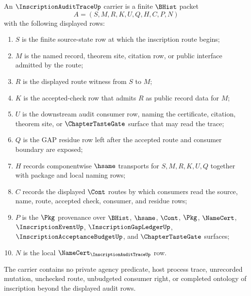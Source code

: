 \begin{definition}
\label{def:inscription-audit-trace-carrier}
An $\InscriptionAuditTraceUp$ carrier is a finite $\BHist$ packet
$$
A=(S,M,R,K,U,Q,H,C,P,N)
$$
with the following displayed rows:
\begin{enumerate}
\item $S$ is the finite source-state row at which the inscription route begins;
\item $M$ is the named record, theorem site, citation row, or public interface admitted by the route;
\item $R$ is the displayed route witness from $S$ to $M$;
\item $K$ is the accepted-check row that admits $R$ as public record data for $M$;
\item $U$ is the downstream audit consumer row, naming the certificate, citation, theorem site, or $\ChapterTasteGate$ surface that may read the trace;
\item $Q$ is the GAP residue row left after the accepted route and consumer boundary are exposed;
\item $H$ records componentwise $\hsame$ transports for $S,M,R,K,U,Q$ together with package and local naming rows;
\item $C$ records the displayed $\Cont$ routes by which consumers read the source, name, route, accepted check, consumer, and residue rows;
\item $P$ is the $\Pkg$ provenance over $\BHist$, $\hsame$, $\Cont$, $\Pkg$, $\NameCert$, $\InscriptionEventUp$, $\InscriptionGapLedgerUp$, $\InscriptionAcceptanceBudgetUp$, and $\ChapterTasteGate$ surfaces;
\item $N$ is the local $\NameCert_{\InscriptionAuditTraceUp}$ row.
\end{enumerate}
The carrier contains no private agency predicate, host process trace, unrecorded mutation, unchecked route, unbudgeted consumer right, or completed ontology of inscription beyond the displayed audit rows.
\end{definition}

